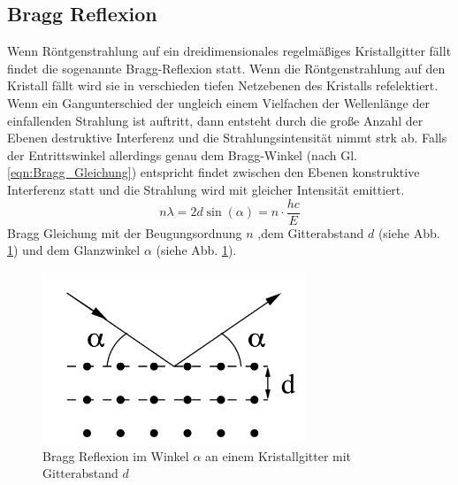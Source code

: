 \subsection{Bragg Reflexion}
Wenn Röntgenstrahlung auf ein dreidimensionales regelmäßiges Kristallgitter fällt findet die sogenannte Bragg-Reflexion statt.
Wenn die Röntgenstrahlung auf den Kristall fällt wird sie in verschieden tiefen Netzebenen des Kristalls refelektiert. Wenn ein Gangunterschied der ungleich einem Vielfachen der Wellenlänge der einfallenden Strahlung ist auftritt, dann entsteht durch die große Anzahl der Ebenen destruktive Interferenz und die Strahlungsintensität nimmt strk ab.
Falls der Entrittswinkel allerdings genau dem Bragg-Winkel (nach Gl. \ref{eqn:Bragg_Gleichung}) entspricht findet zwischen den Ebenen konstruktive Interferenz statt und die Strahlung wird mit gleicher Intensität emittiert.
\begin{equation}
    n\lambda = 2 d \sin(\alpha) = n\cdot \frac{hc}{E} \label{eqn:Bragg_Gleichung}
\end{equation}
Bragg Gleichung mit der Beugungsordnung $n$ ,dem Gitterabstand $d$ (siehe Abb. \ref{fig:Bragg_Reflexion}) und dem Glanzwinkel $\alpha$ (siehe Abb. \ref{fig:Bragg_Reflexion}).
\begin{figure}
    \centering
    \includegraphics[width=0.7\textwidth]{bilder/Bragg_Reflexion.png}
    \caption{Bragg Reflexion im Winkel $\alpha$ an einem Kristallgitter mit Gitterabstand $d$ }
    \label{fig:Bragg_Reflexion}
\end{figure}

